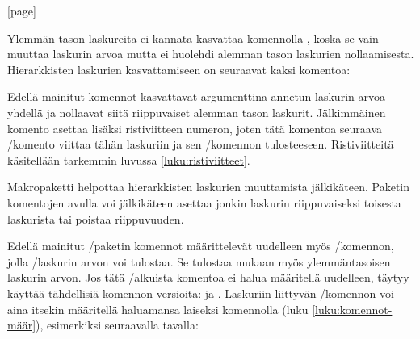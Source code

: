 \begin{koodilohkosis}
  [page]
\end{koodilohkosis}

Ylemmän tason laskureita ei kannata kasvattaa komennolla , koska se vain muuttaa laskurin arvoa mutta ei
huolehdi alemman tason laskurien nollaamisesta. Hierarkkisten laskurien
kasvattamiseen on seuraavat kaksi komentoa:

\begin{koodilohkosis}
\end{koodilohkosis}

Edellä mainitut komennot kasvattavat argumenttina annetun laskurin arvoa
yhdellä ja nollaavat siitä riippuvaiset alemman tason laskurit.
Jälkimmäinen komento  asettaa lisäksi
ristiviitteen numeron, joten tätä komentoa seuraava \-/komento viittaa tähän laskuriin ja sen \-/komennon tulosteeseen. Ristiviitteitä käsitellään
tarkemmin luvussa \ref{luku:ristiviitteet}.

Makropaketti  helpottaa
hierarkkisten laskurien muuttamista jälkikäteen. Paketin komentojen
avulla voi jälkikäteen asettaa jonkin laskurin riippuvaiseksi toisesta
laskurista tai poistaa riippuvuuden.

\begin{koodilohkosis}
\end{koodilohkosis}

Edellä mainitut \-/paketin komennot määrittelevät
uudelleen myös \-/komennon, jolla
\-/laskurin arvon voi tulostaa. Se tulostaa mukaan myös
ylemmäntasoisen laskurin arvon. Jos tätä \-/alkuista
komentoa ei halua määritellä uudelleen, täytyy käyttää tähdellisiä
komennon versioita:  ja . Laskuriin liittyvän \-/komennon
voi aina itsekin määritellä haluamansa laiseksi komennolla  (luku \ref{luku:komennot-määr}), esimerkiksi seuraavalla
tavalla:

\begin{koodilohkosis}
  \renewcommand{\theoma}{\arabic{page}/\alph{oma}}
\end{koodilohkosis}

